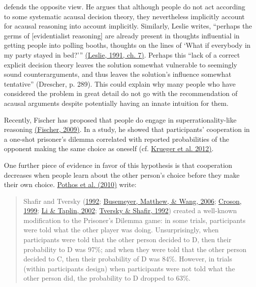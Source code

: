 \citet[page 288f]{Drescher2006-ky} defends the opposite view. He
argues that although people do not act according to some systematic
acausal decision theory, they nevertheless implicitly account for
acausal reasoning into account implicitly. Similarly, Leslie
writes, ``perhaps the germs of {[}evidentialist
reasoning{]} are already present in thoughts influential in getting
people into polling booths, thoughts on the lines of `What if everybody in my party stayed in
bed?'''
\href{https://sl4librarian.files.wordpress.com/2016/12/two-bird-deaths-one-throw-leslie.pdf}{(Leslie,
1991, ch. 7)}. Perhaps this ``lack of a correct explicit decision theory leaves the solution
somewhat vulnerable to seemingly sound counterarguments, and thus leaves the solution's influence
somewhat tentative'' (Drescher, p. 289). This could explain why many people who have considered the
problem in great detail do not go with the recommendation of acausal arguments despite potentially
having an innate intuition for them.

Recently, Fischer has proposed that people do engage in superrationality-like
reasoning
\href{http://citeseerx.ist.psu.edu/viewdoc/download?doi=10.1.1.408.464\&rep=rep1\&type=pdf}{(Fischer,
2009)}. In a study, he showed that participants' cooperation in a one-shot prisoner's dilemma
correlated with reported probabilities of
the opponent making the same choice as oneself (cf.
\href{https://sl4librarian.files.wordpress.com/2017/01/krueger2012-social-projection.pdf}{Krueger
et al. 2012)}.

One further piece of evidence in favor of this hypothesis is that
cooperation decreases when people learn about the other person's choice
before they make their own choice.
\href{https://www.researchgate.net/publication/222823221_Understanding_cooperation_in_the_Prisoner\%27s_Dilemma_game}{Pothos
et al. (2010)} write:

\begin{quote}
Shafir and Tversky
(\href{http://citeseerx.ist.psu.edu/viewdoc/download?doi=10.1.1.371.8926\&rep=rep1\&type=pdf\#page=720}{1992};
\href{http://bacon.umcs.lublin.pl/~lukasik/wp-content/uploads/2010/12/A-Quantum-Information-Processing-p131.pdf}{Busemeyer,
Matthew, \& Wang, 2006};
\href{http://citeseerx.ist.psu.edu/viewdoc/download?doi=10.1.1.318.6368\&rep=rep1\&type=pdf}{Croson,
1999};
\href{https://www.researchgate.net/publication/285712430_Examining_whether_there_is_a_disjunction_effect_in_prisoner\%27s_dilemma_games}{Li
\& Taplin, 2002};
\href{https://www.researchgate.net/publication/240286082_The_Disjunction_Effect_in_Choice_Under_Uncertainty}{Tversky
\& Shafir, 1992}) created a well-known modification to the Prisoner's
Dilemma game: in some trials, participants were told what the other
player was doing. Unsurprisingly, when participants were told that the
other person decided to D, then their probability to D was 97\%; and
when they were told that the other person decided to C, then their
probability of D was 84\%. However, in trials (within participants
design) when participants were not told what the other person did, the
probability to D dropped to 63\%.
\end{quote}

